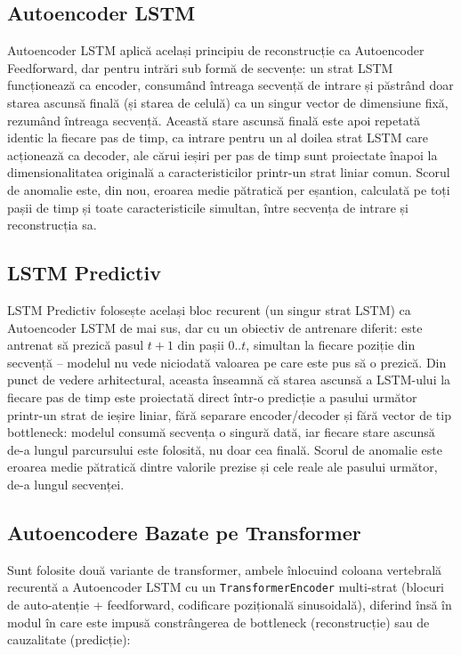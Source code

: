 \subsection{Autoencoder LSTM}

Autoencoder LSTM aplică același principiu de reconstrucție ca Autoencoder Feedforward, dar pentru intrări sub formă de secvențe: un strat LSTM funcționează ca encoder, consumând întreaga secvență de intrare și păstrând doar starea ascunsă finală (și starea de celulă) ca un singur vector de dimensiune fixă, rezumând întreaga secvență. Această stare ascunsă finală este apoi repetată identic la fiecare pas de timp, ca intrare pentru un al doilea strat LSTM care acționează ca decoder, ale cărui ieșiri per pas de timp sunt proiectate înapoi la dimensionalitatea originală a caracteristicilor printr-un strat liniar comun.
Scorul de anomalie este, din nou, eroarea medie pătratică per eșantion, calculată pe toți pașii de timp și toate caracteristicile simultan, între secvența de intrare și reconstrucția sa.

\subsection{LSTM Predictiv}

LSTM Predictiv folosește același bloc recurent (un singur strat LSTM) ca Autoencoder LSTM de mai sus, dar cu un obiectiv de antrenare diferit: este antrenat să prezică pasul $t+1$ din pașii $0..t$, simultan la fiecare poziție din secvență -- modelul nu vede niciodată valoarea pe care este pus să o prezică.
Din punct de vedere arhitectural, aceasta înseamnă că starea ascunsă a LSTM-ului la fiecare pas de timp este proiectată direct într-o predicție a pasului următor printr-un strat de ieșire liniar, fără separare encoder/decoder și fără vector de tip bottleneck: modelul consumă secvența o singură dată, iar fiecare stare ascunsă de-a lungul parcursului este folosită, nu doar cea finală.
Scorul de anomalie este eroarea medie pătratică dintre valorile prezise și cele reale ale pasului următor, de-a lungul secvenței.

\subsection{Autoencodere Bazate pe Transformer}

Sunt folosite două variante de transformer, ambele înlocuind coloana vertebrală recurentă a Autoencoder LSTM cu un \texttt{TransformerEncoder} multi-strat (blocuri de auto-atenție + feedforward, codificare pozițională sinusoidală), diferind însă în modul în care este impusă constrângerea de bottleneck (reconstrucție) sau de cauzalitate (predicție):

